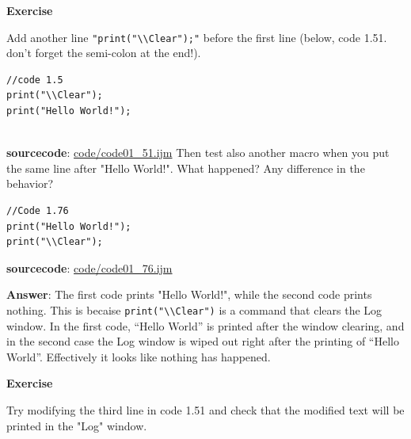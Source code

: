 \documentclass[11pt,a4paper,oneside]{report}
\newenvironment{indentexercise}[1]
{{\setlength{\leftmargin}{2em}}
\textbf{Exercise \thesubsection-#1}
\begin{list}{}
	\item
}
{\end{list}}
\newcommand{\ilcom}[1]{\texttt{\small#1}}
\begin{document}
\begin{indentexercise}{1}
\item Add another line \texttt{"print("\textbackslash{}\textbackslash{}Clear");"} 
before the first line (below, code 1.51. don't forget the semi-colon at the end!). 
\item 
\begin{lstlisting}
//code 1.5
print("\\Clear");
print("Hello World!");


\end{lstlisting}
\textbf{sourcecode}: \href{http://www.example.com/contents}{code/code01\_51.ijm}
Then test also another macro when you put the same line after "Hello World!". 
What happened? Any difference in the behavior? 
\item 
\begin{lstlisting}
//Code 1.76
print("Hello World!");
print("\\Clear");
\end{lstlisting}
\textbf{sourcecode}: \href{http://www.example.com/contents}{code/code01\_76.ijm}
\item \textbf{Answer}: The first code prints "Hello World!", while the second code prints nothing. This is becaise \ilcom{print("\textbackslash{}\textbackslash{}Clear")} is a command that clears the Log window. In the first code, ``Hello World'' is printed after the window clearing, and in the second case the Log window is wiped out right after the printing of ``Hello World''. Effectively it looks like nothing has happened.  
\end{indentexercise}

\begin{indentexercise}{2}
\item Try modifying the third line in code 1.51
and check that the modified text will be printed in the "Log" window. \\
\end{indentexercise}
\end{document}
